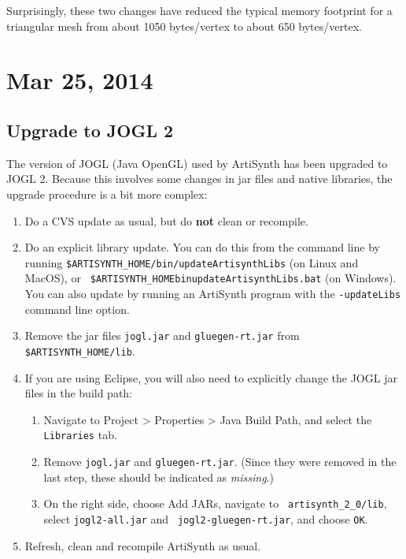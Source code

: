\documentclass{article}
\begin{document}
Surprisingly, these two changes have reduced the typical memory
footprint for a triangular mesh from about 1050 bytes/vertex to about
650 bytes/vertex.

\section*{Mar 25, 2014}

\subsection*{Upgrade to JOGL 2}

The version of JOGL (Java OpenGL) used by ArtiSynth has been upgraded to JOGL 2.
Because this involves some changes in jar files and native libraries,
the upgrade procedure is a bit more complex:

\begin{enumerate}

\item Do a CVS update as usual, but do {\bf not} clean or recompile.

\item Do an explicit library update. You can do this from the command
line by running {\tt \$ARTISYNTH\_HOME/bin/updateArtisynthLibs} (on
Linux and MacOS), or {\tt
\$ARTISYNTH\_HOME\BKS bin\BKS updateArtisynthLibs.bat} (on Windows).  You can
also update by running an ArtiSynth program with the {\tt -updateLibs}
command line option.

\item Remove the jar files {\tt jogl.jar} and {\tt gluegen-rt.jar}
from {\tt \$ARTISYNTH\_HOME/lib}.

\item If you are using Eclipse, you will also need to explicitly change the
JOGL jar files in the build path:

\begin{enumerate}

\item Navigate to {\sf Project > Properties > Java Build Path},
and select the {\tt Libraries} tab.

\item Remove {\tt jogl.jar} and {\tt gluegen-rt.jar}. (Since they were
removed in the last step, these should be indicated as {\it missing}.)

\item On the right side, choose {\sf Add JARs}, navigate to {\tt
artisynth\_2\_0/lib}, select {\tt jogl2-all.jar} and {\tt
jogl2-gluegen-rt.jar}, and choose {\tt OK}.

\end{enumerate}

\item Refresh, clean and recompile ArtiSynth as usual.

\end{enumerate}
\end{document}
